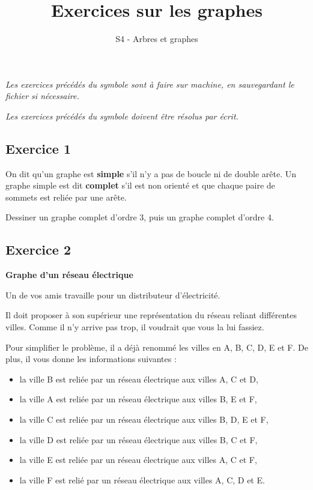 \documentclass[
  letterpaper,
  DIV=11,
  numbers=noendperiod]{scrartcl}
\title{Exercices sur les graphes}
\subtitle{S4 - Arbres et graphes}
\author{}
\date{}
\providecommand{\tightlist}{%
  \setlength{\itemsep}{0pt}\setlength{\parskip}{0pt}}\usepackage{longtable,booktabs,array}
\begin{document}
\maketitle
\ifdefined\Shaded\renewenvironment{Shaded}{\begin{tcolorbox}[breakable, boxrule=0pt, sharp corners, borderline west={3pt}{0pt}{shadecolor}, interior hidden, frame hidden, enhanced]}{\end{tcolorbox}}\fi

\emph{Les exercices précédés du symbole  sont à faire
sur machine, en sauvegardant le fichier si nécessaire.}

\emph{Les exercices précédés du symbole  doivent être
résolus par écrit.}

\hypertarget{exercice-1}{%
\subsection{\texorpdfstring{ Exercice
1}{ Exercice 1}}\label{exercice-1}}

On dit qu'un graphe est \textbf{simple} s'il n'y a pas de boucle ni de
double arête. Un graphe simple est dit \textbf{complet} s'il est non
orienté et que chaque paire de sommets est reliée par une arête.

Dessiner un graphe complet d'ordre 3, puis un graphe complet d'ordre 4.

\hypertarget{exercice-2}{%
\subsection{\texorpdfstring{ Exercice
2}{ Exercice 2}}\label{exercice-2}}

\textbf{Graphe d'un réseau électrique}

Un de vos amis travaille pour un distributeur d'électricité.

Il doit proposer à son supérieur une représentation du réseau reliant
différentes villes. Comme il n'y arrive pas trop, il voudrait que vous
la lui fassiez.

Pour simplifier le problème, il a déjà renommé les villes en A, B, C, D,
E et F. De plus, il vous donne les informations suivantes :

\begin{itemize}
\tightlist
\item
  la ville B est reliée par un réseau électrique aux villes A, C et D,
\item
  la ville A est reliée par un réseau électrique aux villes B, E et F,
\item
  la ville C est reliée par un réseau électrique aux villes B, D, E et
  F,
\item
  la ville D est reliée par un réseau électrique aux villes B, C et F,
\item
  la ville E est reliée par un réseau électrique aux villes A, C et F,
\item
  la ville F est relié par un réseau électrique aux villes A, C, D et E.
\end{itemize}
\end{document}
